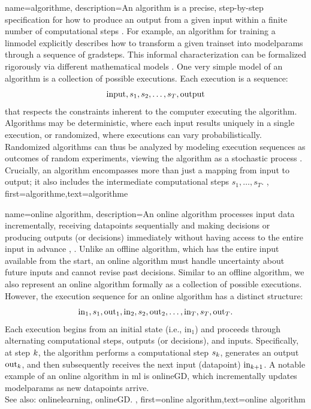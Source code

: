 {name={algorithme},
  description={An algorithm is a precise, step-by-step specification for 
  	how to produce an output from a given input within a finite number of computational steps \cite{Cormen:2022aa}. 
    For example, an algorithm for training a \gls{linmodel} explicitly describes how to 
	transform a given \gls{trainset} into \gls{modelparams} through a sequence of \gls{gradstep}s. 
    This informal characterization can be formalized rigorously via different mathematical \gls{model}s \cite{Sipser2013}. 
    One very simple \gls{model} of an algorithm is a collection of possible executions. Each execution is a sequence:
    $${\rm input},s_1,s_2,\ldots,s_T,{\rm output}$$ 
    that respects the constraints inherent to the computer executing the algorithm.
	Algorithms may be deterministic, where each input results uniquely in a single execution,
	or randomized, where executions can vary probabilistically. Randomized algorithms 
	can thus be analyzed by modeling execution sequences as outcomes of random experiments, 
	viewing the algorithm as a stochastic process \cite{RandomizedAlgos,BertsekasProb,Gallager13}.
	Crucially, an algorithm encompasses more than just a mapping from input to output; it also includes 
	the intermediate computational steps $s_1,\ldots,s_T$. 
	},
	first={algorithme},text={algorithme} 
}

{name={online algorithm},
	description={An online \gls{algorithm} processes input \gls{data} incrementally, 
		receiving \gls{datapoint}s sequentially and making decisions or producing outputs (or decisions) immediately 
		without having access to the entire input in advance \cite{PredictionLearningGames}, \cite{HazanOCO}. 
		Unlike an offline \gls{algorithm}, which has the entire input available from the start, an online \gls{algorithm} 
		must handle \gls{uncertainty} about future inputs and cannot revise past decisions. Similar to an 
		offline \gls{algorithm}, we also represent an online \gls{algorithm} formally as a collection of possible 
		executions. However, the execution sequence for an online \gls{algorithm} has a distinct structure:
		$${\rm in}_{1},s_1,{\rm out}_{1},{\rm in}_{2},s_2,{\rm out}_{2},\ldots,{\rm in}_{T},s_T,{\rm out}_{T}.$$ 
		Each execution begins from an initial state (i.e., \(\text{in}_{1}\)) and proceeds through alternating 
		computational steps, outputs (or decisions), and inputs. Specifically, at step \(k\), 
		the \gls{algorithm} performs a computational step \(s_{k}\), generates an output \(\text{out}_{k}\), 
		and then subsequently receives the next input (\gls{datapoint}) \(\text{in}_{k+1}\). A 
		notable example of an online \gls{algorithm} in \gls{ml} is \gls{onlineGD}, which incrementally 
		updates \gls{modelparams} as new \gls{datapoint}s arrive. 
		\\ See also: \gls{onlinelearning}, \gls{onlineGD}.
	},
	first={online algorithm},text={online algorithm} 
}

